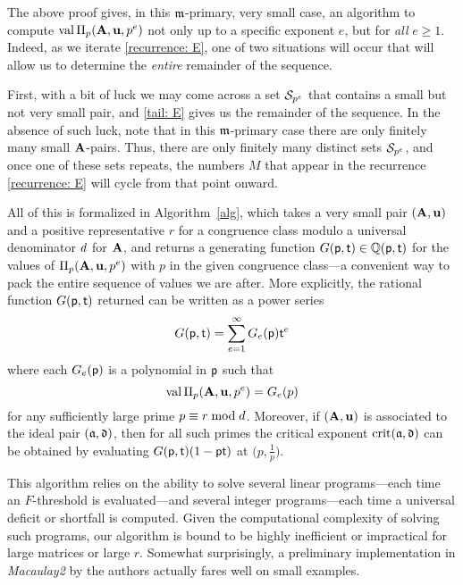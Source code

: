 \documentclass{amsart}
\begin{document}
\begin{remark}[An algorithm]
   \label{m-primary algorithm: R}
   The above proof gives, in this $\idealm$-primary, very small case, an algorithm to compute $\val\IP_p(\matA,\vv{u},p^e)$ not only up to a specific exponent $e$, but for \emph{all} $e \ge 1$.
   Indeed, as we iterate \eqref{recurrence: E}, one of two situations will occur that will allow us to determine the \emph{entire} remainder of the sequence.

   First, with a bit of luck we may come across a set $\S_{p^e}$ that contains a small but not very small pair, and \eqref{tail: E} gives us the remainder of the sequence.
   In the absence of such luck, note that in this $\idealm$-primary case there are only finitely many small $\matA$-pairs.
   Thus, there are only finitely many distinct sets $\S_{p^e}$, and once one of these sets repeats, the numbers $M$ that appear in the recurrence \eqref{recurrence: E} will cycle from that point onward.

   All of this is formalized in Algorithm~\ref{alg}, which takes a very small pair $(\matA,\vv{u})$ and a positive representative $r$ for a congruence class modulo a universal denominator $\denom$ for $\matA$, and returns a generating function $G(\pp,\tt) \in \QQ(\pp,\tt)$ for the values of $\IP_p(\matA,\vv{u},p^e)$ with $p$ in the given congruence class---a convenient way to pack the entire sequence of values we are after.
   More explicitly, the rational function $G(\pp,\tt)$ returned can be written as a power series
   \[G(\pp,\tt) = \sum_{e=1}^\infty G_e(\pp)\tt^e\]
   where each $G_e(\pp)$ is a polynomial in $\pp$ such that
   \[ \val \IP_p(\matA,\vv{u},p^e) = G_e(p)\]
   for any sufficiently large prime $p\equiv r\bmod \denom$.
   Moreover, if $(\matA,\vv{u})$ is associated to the ideal pair $(\ideala,\ideald)$, then for all such primes the critical exponent $\crit(\ideala,\ideald)$ can be obtained by evaluating $G(\pp,\tt)(1-\pp\tt)$ at $\big(p,\frac1p\big)$.

  This algorithm relies on the ability to solve several linear programs---each time an $F$-threshold is evaluated---and several integer programs---each time a universal deficit or shortfall is computed.
   Given the computational complexity of solving such programs, our algorithm is bound to be highly inefficient or impractical for large matrices or large $r$.
   Somewhat surprisingly, a preliminary implementation in \emph{Macaulay2} \cite{M2} by the authors actually fares well on small examples.
\end{remark}
\end{document}
